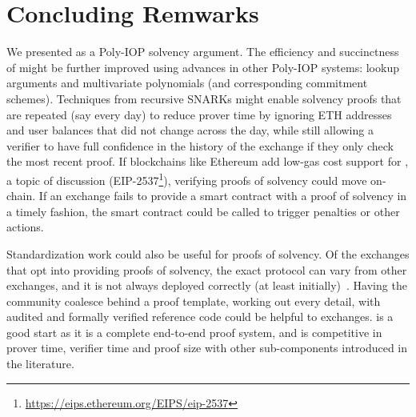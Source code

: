\chapter{Concluding Remwarks}

We presented \Sys as a Poly-IOP solvency argument. The efficiency and succinctness of \Sys might be further improved using advances in other Poly-IOP systems: lookup arguments and multivariate polynomials (and corresponding commitment schemes). Techniques from recursive SNARKs might enable solvency proofs that are repeated (say every day) to reduce prover time by ignoring ETH addresses and user balances that did not change across the day, while still allowing a verifier to have full confidence in the history of the exchange if they only check the most recent proof. If blockchains like Ethereum add low-gas cost support for \bls, a topic of discussion (EIP-2537\footnote{\url{https://eips.ethereum.org/EIPS/eip-2537}}), verifying proofs of solvency could move on-chain. If an exchange fails to provide a smart contract with a proof of solvency in a timely fashion, the smart contract could be called to trigger penalties or other actions. 

Standardization work could also be useful for proofs of solvency. Of the exchanges that opt into providing proofs of solvency, the exact protocol can vary from other exchanges, and it is not always deployed correctly (at least initially)~\cite{broken}. Having the community coalesce behind a proof template, working out every detail, with audited and formally verified reference code could be helpful to exchanges. \Sys is a good start as it is a complete end-to-end proof system, and is competitive in prover time, verifier time and proof size with other sub-components introduced in the literature.
